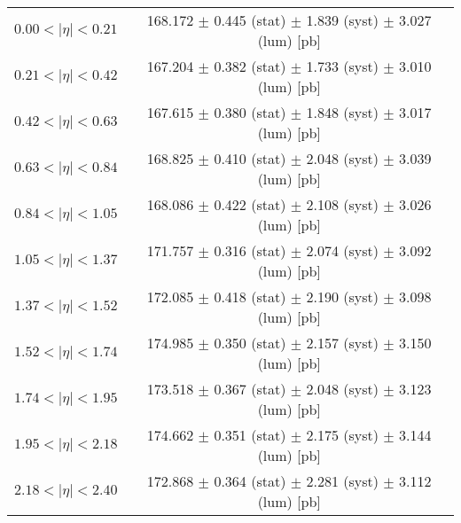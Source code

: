 \begin{tabular}{lc}
\hline
$0.00 < |\eta| <0.21$          & 168.172 $\pm$ 0.445 (stat) $\pm$ 1.839 (syst) $\pm$ 3.027 (lum) [pb]  \\
$0.21 < |\eta| <0.42$          & 167.204 $\pm$ 0.382 (stat) $\pm$ 1.733 (syst) $\pm$ 3.010 (lum) [pb]  \\
$0.42 < |\eta| <0.63$          & 167.615 $\pm$ 0.380 (stat) $\pm$ 1.848 (syst) $\pm$ 3.017 (lum) [pb]  \\
$0.63 < |\eta| <0.84$          & 168.825 $\pm$ 0.410 (stat) $\pm$ 2.048 (syst) $\pm$ 3.039 (lum) [pb]  \\
$0.84 < |\eta| <1.05$          & 168.086 $\pm$ 0.422 (stat) $\pm$ 2.108 (syst) $\pm$ 3.026 (lum) [pb]  \\
$1.05 < |\eta| <1.37$          & 171.757 $\pm$ 0.316 (stat) $\pm$ 2.074 (syst) $\pm$ 3.092 (lum) [pb]  \\
$1.37 < |\eta| <1.52$          & 172.085 $\pm$ 0.418 (stat) $\pm$ 2.190 (syst) $\pm$ 3.098 (lum) [pb]  \\
$1.52 < |\eta| <1.74$          & 174.985 $\pm$ 0.350 (stat) $\pm$ 2.157 (syst) $\pm$ 3.150 (lum) [pb]  \\
$1.74 < |\eta| <1.95$          & 173.518 $\pm$ 0.367 (stat) $\pm$ 2.048 (syst) $\pm$ 3.123 (lum) [pb]  \\
$1.95 < |\eta| <2.18$          & 174.662 $\pm$ 0.351 (stat) $\pm$ 2.175 (syst) $\pm$ 3.144 (lum) [pb]  \\
$2.18 < |\eta| <2.40$          & 172.868 $\pm$ 0.364 (stat) $\pm$ 2.281 (syst) $\pm$ 3.112 (lum) [pb]  \\
\hline
\end{tabular}
